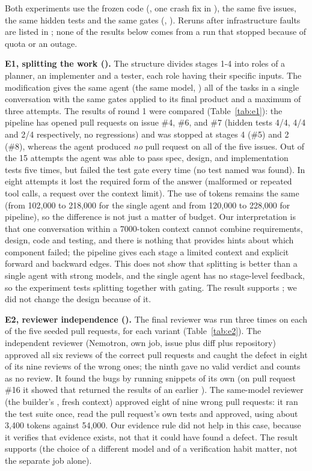 Both experiments use the frozen code (, one crash fix in ), the same five issues, the same hidden tests and the same gates (, ). Reruns after infrastructure faults are listed in ; none of the results below comes from a run that stopped because of quota or an outage.

\textbf{E1, splitting the work ().} The structure divides stages 1-4 into roles of a planner, an implementer and a tester, each role having their specific inputs. The modification gives the same agent (the same model, ) all of the tasks in a single conversation with the same gates applied to its final product and a maximum of three attempts. The results of round 1 were compared (Table~\ref{tab:e1}): the pipeline has opened pull requests on issue \#4, \#6, and \#7 (hidden tests 4/4, 4/4 and 2/4 respectively, no regressions) and was stopped at stages 4 (\#5) and 2 (\#8), whereas the agent produced \emph{no} pull request on all of the five issues. Out of the 15 attempts the agent was able to pass spec, design, and implementation tests five times, but failed the test gate every time (no test named  was found). In eight attempts it lost the required form of the answer (malformed or repeated tool calls, a request over the context limit). The use of tokens remains the same (from 102,000 to 218,000 for the single agent and from 120,000 to 228,000 for pipeline), so the difference is not just a matter of budget. Our interpretation is that one conversation within a 7000-token context cannot combine requirements, design, code and testing, and there is nothing that provides hints about which component failed; the pipeline gives each stage a limited context and explicit forward and backward edges. This does not show that splitting is better than a single agent with strong models, and the single agent has no stage-level feedback, so the experiment tests splitting together with gating. The result supports ; we did not change the design because of it.

\textbf{E2, reviewer independence ().} The final reviewer was run three times on each of the five seeded pull requests, for each variant (Table~\ref{tab:e2}). The independent reviewer (Nemotron, own job, issue plus diff plus repository) approved all six reviews of the correct pull requests and caught the defect in eight of its nine reviews of the wrong ones; the ninth gave no valid verdict and counts as no review. It found the bugs by running snippets of its own (on pull request \#16 it showed that  returned the results of an earlier ). The same-model reviewer (the builder's , fresh context) approved eight of nine wrong pull requests: it ran the test suite once, read the pull request's own tests and approved, using about 3,400 tokens against 54,000. Our evidence rule did not help in this case, because it verifies that evidence exists, not that it could have found a defect. The result supports  (the choice of a different model and of a verification habit matter, not the separate job alone).

